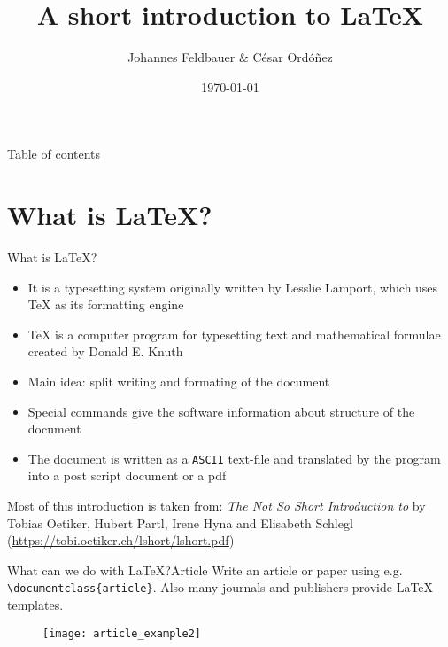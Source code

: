 \documentclass[presentation, aspectratio=1610]{beamer}
\title[Introduction to \LaTeX]{A short introduction to \LaTeX}
\author[J.Feldbauer, C. Ordóñez]{Johannes Feldbauer \& César Ordóñez}
\date{\today}
\begin{document}
\maketitle

\begin{frame}{Table of contents}
  \begin{minipage}[c][.75\textheight]{0.6\textwidth}
    \tableofcontents
  \end{minipage}
  \begin{minipage}{0.25\textwidth}
  \end{minipage}
\end{frame}

\section{What is \LaTeX ?}
\begin{frame}{What is \LaTeX ?}
  \begin{itemize}[<+->]
    \item It is a typesetting system originally written by Lesslie Lamport, which uses \TeX{}  as its formatting engine
    \item \TeX{} is a computer program for typesetting text and mathematical formulae created by Donald E. Knuth
    \item Main idea: split writing and formating of the document
    \item Special commands give the software information about structure of the document
    \item The document is written as a \texttt{ASCII} text-file and translated by the program into a post script document or a pdf
  \end{itemize}
  \vfill
  \begin{block}{}
    {\footnotesize Most of this introduction is taken from: \textit{The Not So Short Introduction to \LaTeXe} by
    Tobias Oetiker, Hubert Partl, Irene Hyna and Elisabeth Schlegl (\url{https://tobi.oetiker.ch/lshort/lshort.pdf})}
  \end{block}
\end{frame}

\begin{frame}{What can we do with \LaTeX{}?}{Article}
  Write an article or paper using e.g. \texttt{\textbackslash{}documentclass\{article\}}. Also many journals and publishers
  provide \LaTeX{} templates.
  \begin{figure}
    \centering
    \texttt{[image: article\_example2]}
  \end{figure}
\end{frame}
\end{document}

